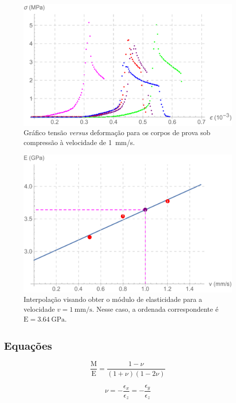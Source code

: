 \documentclass[a4paper, 12pt, brazilian]{article}
\begin{document}
	\begin{figure}[H]
		\centering
		\includegraphics[scale=.6]{images/graph}
		\caption{Gráfico tensão \textit{versus} deformação para os corpos de prova sob compressão à velocidade de \SI{1}{\milli\meter/\second}.}
		\label{fig:graph}
	\end{figure}
	
	\begin{figure}
		\centering
		\includegraphics[scale=.6]{images/interpol}
		\caption{Interpolação visando obter o módulo de elasticidade para a velocidade $v=\SI{1}{\milli\meter/\second}$. Nesse caso, a ordenada correspondente é $\textrm{E}=\SI{3.64}{\giga\pascal}$.}
		\label{fig:interpol}
	\end{figure}
	
	\subsection{Equações}
		
	\begin{equation}\label{main_eq}
		\dfrac{\textrm{M}}{\textrm{E}}=\dfrac{1-\nu}{(1+\nu)(1-2\nu)}
	\end{equation}
	
	\begin{equation}\label{strain}
		\nu=-\dfrac{\epsilon_{x}}{\epsilon_{z}}=-\dfrac{\epsilon_{y}}{\epsilon_{z}}
	\end{equation}
	
\end{document}
